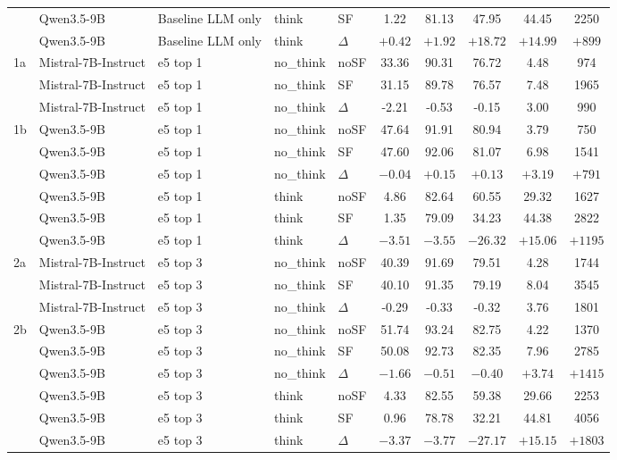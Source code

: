 \begin{scriptsize}
\begin{longtable}{l l l l l c c c c c}
 & Qwen3.5-9B & Baseline LLM only & think & SF & 1.22 & 81.13 & 47.95 & 44.45 & 2250 \\
 & Qwen3.5-9B & Baseline LLM only & think & $\Delta$ & $+0.42$ & $+1.92$ & $+18.72$ & $+14.99$ & $+899$ \\
\dmidrule
1a & Mistral-7B-Instruct & e5 top 1 & no\_think & noSF & 33.36 & 90.31 & 76.72 & 4.48 & 974 \\
 & Mistral-7B-Instruct & e5 top 1 & no\_think & SF & 31.15 & 89.78 & 76.57 & 7.48 & 1965 \\
 & Mistral-7B-Instruct & e5 top 1 & no\_think & $\Delta$ & -2.21 & -0.53 & -0.15 & 3.00 & 990 \\
1b & Qwen3.5-9B & e5 top 1 & no\_think & noSF & 47.64 & 91.91 & 80.94 & 3.79 & 750 \\
 & Qwen3.5-9B & e5 top 1 & no\_think & SF & 47.60 & 92.06 & 81.07 & 6.98 & 1541 \\
 & Qwen3.5-9B & e5 top 1 & no\_think & $\Delta$ & $-0.04$ & $+0.15$ & $+0.13$ & $+3.19$ & $+791$ \\
 & Qwen3.5-9B & e5 top 1 & think & noSF & 4.86 & 82.64 & 60.55 & 29.32 & 1627 \\
 & Qwen3.5-9B & e5 top 1 & think & SF & 1.35 & 79.09 & 34.23 & 44.38 & 2822 \\
 & Qwen3.5-9B & e5 top 1 & think & $\Delta$ & $-3.51$ & $-3.55$ & $-26.32$ & $+15.06$ & $+1195$ \\
\dmidrule
2a & Mistral-7B-Instruct & e5 top 3 & no\_think & noSF & 40.39 & 91.69 & 79.51 & 4.28 & 1744 \\
 & Mistral-7B-Instruct & e5 top 3 & no\_think & SF & 40.10 & 91.35 & 79.19 & 8.04 & 3545 \\
 & Mistral-7B-Instruct & e5 top 3 & no\_think & $\Delta$ & -0.29 & -0.33 & -0.32 & 3.76 & 1801 \\
2b & Qwen3.5-9B & e5 top 3 & no\_think & noSF & 51.74 & 93.24 & 82.75 & 4.22 & 1370 \\
 & Qwen3.5-9B & e5 top 3 & no\_think & SF & 50.08 & 92.73 & 82.35 & 7.96 & 2785 \\
 & Qwen3.5-9B & e5 top 3 & no\_think & $\Delta$ & $-1.66$ & $-0.51$ & $-0.40$ & $+3.74$ & $+1415$ \\
 & Qwen3.5-9B & e5 top 3 & think & noSF & 4.33 & 82.55 & 59.38 & 29.66 & 2253 \\
 & Qwen3.5-9B & e5 top 3 & think & SF & 0.96 & 78.78 & 32.21 & 44.81 & 4056 \\
 & Qwen3.5-9B & e5 top 3 & think & $\Delta$ & $-3.37$ & $-3.77$ & $-27.17$ & $+15.15$ & $+1803$ \\

\end{longtable}
\end{scriptsize}
